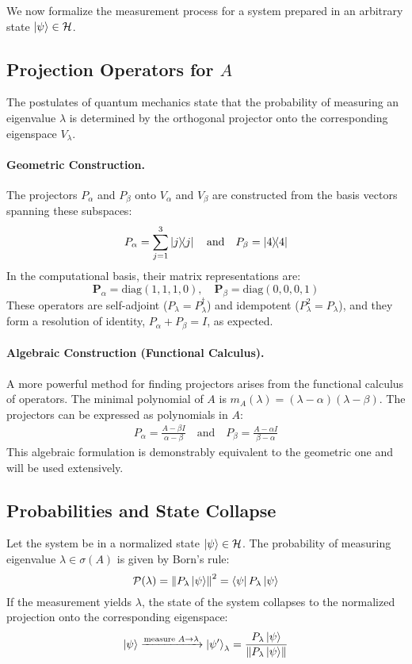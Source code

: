 \documentclass[11pt,a4paper]{article}
\begin{document}
We now formalize the measurement process for a system prepared in an arbitrary
state $\ket{\psi} \in \mathcal{H}$.

\subsection{Projection Operators for \texorpdfstring{$A$}{A}}
The postulates of quantum mechanics state that the probability of measuring an
eigenvalue $\lambda$ is determined by the orthogonal projector onto the
corresponding eigenspace $V_\lambda$.

\paragraph{Geometric Construction.} The projectors $P_\alpha$ and $P_\beta$ onto
$V_\alpha$ and $V_\beta$ are constructed from the basis vectors spanning these
subspaces:
$$ P_\alpha = \sum_{j=1}^{3} \dyad{j}{j} \quad \text{and} \quad P_\beta =
\dyad{4}{4} $$
In the computational basis, their matrix representations are:
$$
\mathbf{P}_\alpha = \text{diag}(1,1,1,0), \quad
\mathbf{P}_\beta = \text{diag}(0,0,0,1)
$$
These operators are self-adjoint ($P_\lambda = P_\lambda^\dagger$) and
idempotent ($P_\lambda^2 = P_\lambda$), and they form a resolution of identity,
$P_\alpha + P_\beta = I$, as expected.

\paragraph{Algebraic Construction (Functional Calculus).}
A more powerful method for finding projectors arises from the functional
calculus of operators. The minimal polynomial of $A$ is $m_A(\lambda) =
(\lambda-\alpha)(\lambda-\beta)$. The projectors can be expressed as polynomials
in $A$:
\begin{align*}
  P_\alpha = \frac{A - \beta I}{\alpha - \beta} \quad \text{and} \quad P_\beta =
  \frac{A - \alpha I}{\beta - \alpha}
\end{align*}
This algebraic formulation is demonstrably equivalent to the geometric one and
will be used extensively.

\subsection{Probabilities and State Collapse}
Let the system be in a normalized state $\ket{\psi} \in \mathcal{H}$. The
probability of measuring eigenvalue $\lambda \in \sigma(A)$ is given by Born's
rule:
$$ \mathcal{P}(\lambda) = \norm{P_\lambda \ket{\psi}}^2 = \bra{\psi} P_\lambda
\ket{\psi} $$
If the measurement yields $\lambda$, the state of the system collapses to the
normalized projection onto the corresponding eigenspace:
$$ \ket{\psi} \xrightarrow{\text{measure } A \to \lambda} \ket{\psi'}_\lambda =
\frac{P_\lambda \ket{\psi}}{\norm{P_\lambda \ket{\psi}}} $$
\end{document}

